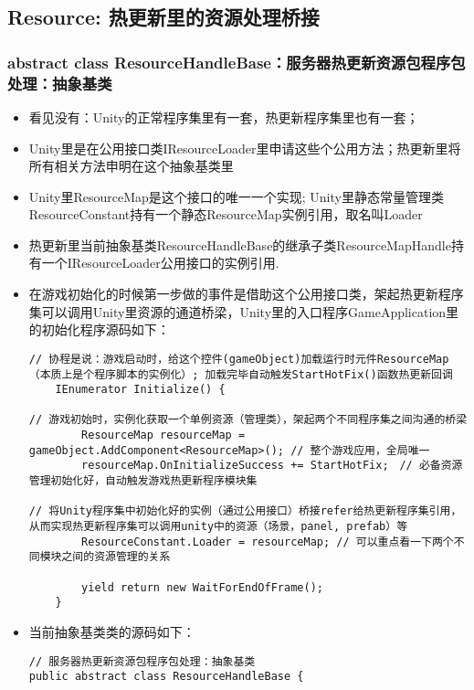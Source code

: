 \documentclass[9pt, b5paper]{article}
\begin{document}
\subsection{Resource: 热更新里的资源处理桥接}
\label{sec-1-2}
\subsubsection{abstract class ResourceHandleBase：服务器热更新资源包程序包处理：抽象基类}
\label{sec-1-2-1}
\begin{itemize}
\item 看见没有：Unity的正常程序集里有一套，热更新程序集里也有一套；
\item Unity里是在公用接口类IResourceLoader里申请这些个公用方法；热更新里将所有相关方法申明在这个抽象基类里
\item Unity里ResourceMap是这个接口的唯一一个实现; Unity里静态常量管理类ResourceConstant持有一个静态ResourceMap实例引用，取名叫Loader
\item 热更新里当前抽象基类ResourceHandleBase的继承子类ResourceMapHandle持有一个IResourceLoader公用接口的实例引用.
\item 在游戏初始化的时候第一步做的事件是借助这个公用接口类，架起热更新程序集可以调用Unity里资源的通道桥梁，Unity里的入口程序GameApplication里的初始化程序源码如下：
\begin{verbatim}
// 协程是说：游戏启动时，给这个控件(gameObject)加载运行时元件ResourceMap（本质上是个程序脚本的实例化）; 加载完毕自动触发StartHotFix()函数热更新回调
    IEnumerator Initialize() { 

// 游戏初始时，实例化获取一个单例资源（管理类），架起两个不同程序集之间沟通的桥梁
        ResourceMap resourceMap = gameObject.AddComponent<ResourceMap>(); // 整个游戏应用，全局唯一
        resourceMap.OnInitializeSuccess += StartHotFix;　// 必备资源管理初始化好，自动触发游戏热更新程序模块集

// 将Unity程序集中初始化好的实例（通过公用接口）桥接refer给热更新程序集引用，从而实现热更新程序集可以调用unity中的资源（场景，panel, prefab）等
        ResourceConstant.Loader = resourceMap; // 可以重点看一下两个不同模块之间的资源管理的关系

        yield return new WaitForEndOfFrame();
    }
\end{verbatim}
\item 当前抽象基类类的源码如下：
\begin{verbatim}
// 服务器热更新资源包程序包处理：抽象基类
public abstract class ResourceHandleBase {


\end{verbatim}
\end{itemize}
\end{document}
